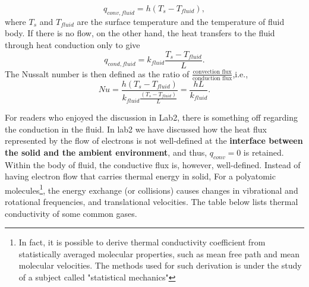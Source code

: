 \begin{equation}
    q_{conv,fluid}=h(T_s-T_{fluid}),
\end{equation}
where $T_s$ and $T_{fluid}$ are the surface temperature and the temperature of fluid body. If there is no flow, on the other hand, the heat transfers to the fluid through heat conduction only to give
\begin{equation}
    q_{cond,fluid}=k_{fluid}\frac{T_{s}-T_{fluid}}{L}.
\end{equation}
The Nussalt number is then defined as the ratio of $\frac{\text{convection flux}}{\text{conduction flux}}$,i.e.,
\begin{equation}
    Nu=\frac{h(T_s-T_{fluid})}{k_{fluid}\frac{(T_{s}-T_{fluid})}{L}}=\frac{hL}{k_{fluid}}.
\end{equation}

For readers who enjoyed the discussion in Lab2, there is something off regarding the conduction in the fluid. In lab2 we have discussed how the heat flux represented by the flow of electrons is not well-defined at the \textbf{interface between the solid and the ambient environment}, and thus, $q_{conv}=0$ is retained. Within the body of fluid, the conductive flux is, however, well-defined. Instead of having electron flow that carries thermal energy in solid,  For a polyatomic molecules\footnote{In fact, it is possible to derive thermal conductivity coefficient from statistically averaged molecular properties, such as mean free path and mean molecular velocities. The methods used for such derivation is under the study of a subject called "statistical mechanics"}, the energy exchange (or collisions) causes changes in vibrational and rotational frequencies, and translational velocities. The table below lists thermal conductivity of some common gases.

